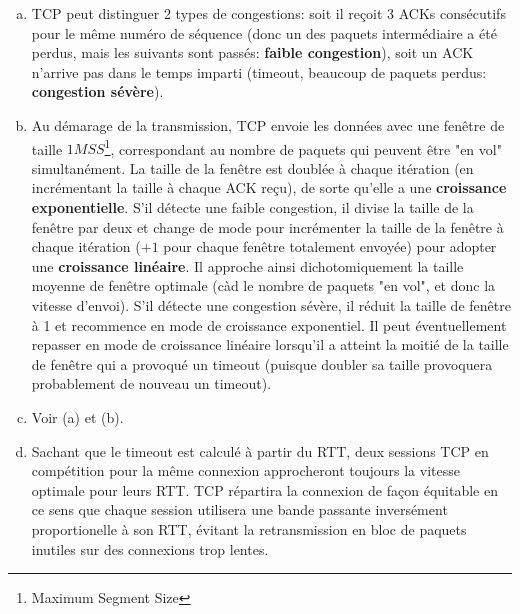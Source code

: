\begin{enumerate}[(a)]
    \item TCP peut distinguer 2 types de congestions: soit il reçoit 3 ACKs consécutifs pour le même numéro de séquence (donc un des paquets intermédiaire a été perdus, mais les suivants sont passés: \textbf{faible congestion}), soit un ACK n'arrive pas dans le temps imparti (timeout, beaucoup de paquets perdus: \textbf{congestion sévère}).

    \item Au démarage de la transmission, TCP envoie les données avec une fenêtre de taille $1MSS$\footnote{Maximum Segment Size}, correspondant au nombre de paquets qui peuvent être "en vol" simultanément. La taille de la fenêtre est doublée à chaque itération (en incrémentant la taille à chaque ACK reçu), de sorte qu'elle a une \textbf{croissance exponentielle}. S'il détecte une faible congestion, il divise la taille de la fenêtre par deux et change de mode pour incrémenter la taille de la fenêtre à chaque itération ($+1$ pour chaque fenêtre totalement envoyée) pour adopter une \textbf{croissance linéaire}. Il approche ainsi dichotomiquement la taille moyenne de fenêtre optimale (càd le nombre de paquets "en vol", et donc la vitesse d'envoi). S'il détecte une congestion sévère, il réduit la taille de fenêtre à 1 et recommence en mode de croissance exponentiel. Il peut éventuellement repasser en mode de croissance linéaire lorsqu'il a atteint la moitié de la taille de fenêtre qui a provoqué un timeout (puisque doubler sa taille provoquera probablement de nouveau un timeout).

    \item Voir (a) et (b).

    \item Sachant que le timeout est calculé à partir du RTT, deux sessions TCP en compétition pour la même connexion approcheront toujours la vitesse optimale pour leurs RTT. TCP répartira la connexion de façon équitable en ce sens que chaque session utilisera une bande passante inversément proportionelle à son RTT, évitant la retransmission en bloc de paquets inutiles sur des connexions trop lentes.
\end{enumerate}
\color{black}



\renewcommand{\questionA}{Enoncez les différents types de matrice de commutation (« switch fabric ») rencontrées dans les routeurs, ainsi que leurs avantages/inconvénients respectifs. } 
\renewcommand{\questionB}{Expliquez la raison d’être et l’inconvénient potentiel d’une bufferisation au niveau des ports d’entrées. } 
\renewcommand{\questionC}{Expliquez la raison d’être d’une bufferisation au niveau des ports de sortie. }
